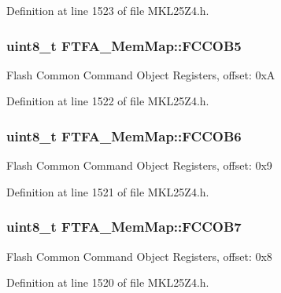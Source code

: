 Definition at line 1523 of file M\+K\+L25\+Z4.\+h.

\subsubsection[{\texorpdfstring{F\+C\+C\+O\+B5}{FCCOB5}}]{\setlength{\rightskip}{0pt plus 5cm}uint8\+\_\+t F\+T\+F\+A\+\_\+\+Mem\+Map\+::\+F\+C\+C\+O\+B5}\hypertarget{struct_f_t_f_a___mem_map_ab6f832a0a58ddeb422d97dc9aa7b1400}{}\label{struct_f_t_f_a___mem_map_ab6f832a0a58ddeb422d97dc9aa7b1400}
Flash Common Command Object Registers, offset\+: 0xA 

Definition at line 1522 of file M\+K\+L25\+Z4.\+h.

\subsubsection[{\texorpdfstring{F\+C\+C\+O\+B6}{FCCOB6}}]{\setlength{\rightskip}{0pt plus 5cm}uint8\+\_\+t F\+T\+F\+A\+\_\+\+Mem\+Map\+::\+F\+C\+C\+O\+B6}\hypertarget{struct_f_t_f_a___mem_map_adabdf0cf22dde1f882cbf48bcc25812e}{}\label{struct_f_t_f_a___mem_map_adabdf0cf22dde1f882cbf48bcc25812e}
Flash Common Command Object Registers, offset\+: 0x9 

Definition at line 1521 of file M\+K\+L25\+Z4.\+h.

\subsubsection[{\texorpdfstring{F\+C\+C\+O\+B7}{FCCOB7}}]{\setlength{\rightskip}{0pt plus 5cm}uint8\+\_\+t F\+T\+F\+A\+\_\+\+Mem\+Map\+::\+F\+C\+C\+O\+B7}\hypertarget{struct_f_t_f_a___mem_map_ae75356f3f7ab83b1e970d6c0e4ec4001}{}\label{struct_f_t_f_a___mem_map_ae75356f3f7ab83b1e970d6c0e4ec4001}
Flash Common Command Object Registers, offset\+: 0x8 

Definition at line 1520 of file M\+K\+L25\+Z4.\+h.

